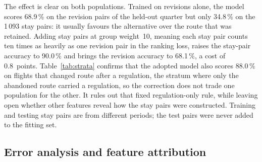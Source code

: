 \documentclass[a4paper,conference]{IEEEtran}
\begin{document}
The effect is clear on both populations. Trained on revisions alone, the
model scores 68.9\,\% on the revision pairs of the held-out quarter but
only 34.8\,\% on the 1\,093 stay pairs: it usually favours the
alternative over the route that was retained. Adding stay pairs
at group weight~10, meaning each stay pair counts ten times as heavily as
one revision pair in the ranking loss, raises the stay-pair accuracy to
90.0\,\% and brings the revision accuracy to 68.1\,\%, a cost of
0.8~points.
Table~\ref{tab:strata} confirms that the adopted model also scores
88.0\,\% on flights that changed route after a regulation, the stratum
where only the abandoned route carried a regulation, so the correction
does not trade one
population for the other. It rules out that fixed regulation-only rule,
while leaving open whether other features reveal how the stay pairs were
constructed. Training and testing stay pairs are from different periods;
the test pairs were never added to the fitting set.

\subsection{Error analysis and feature attribution}
\end{document}
